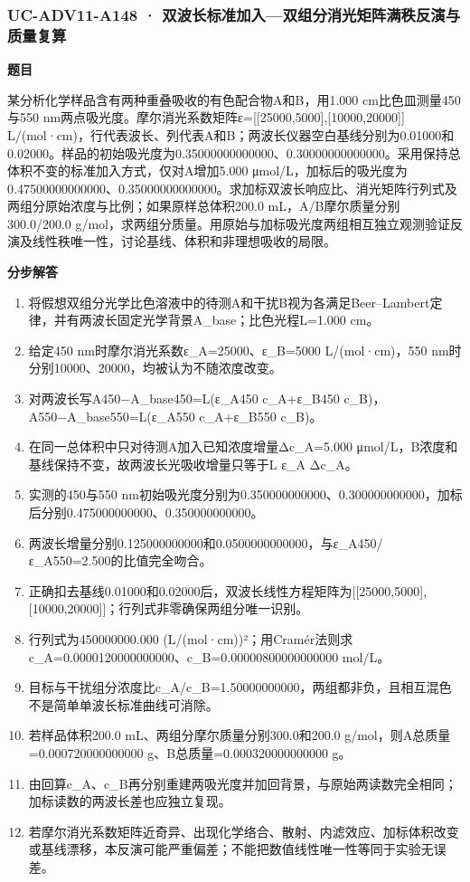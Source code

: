 \documentclass[UTF8,11pt,a4paper]{ctexart}
\begin{document}
\subsubsection*{UC-ADV11-A148 · 双波长标准加入—双组分消光矩阵满秩反演与质量复算}
\noindent\textbf{题目}\par
某分析化学样品含有两种重叠吸收的有色配合物A和B，用1.000 cm比色皿测量450与550 nm两点吸光度。摩尔消光系数矩阵ε=[[25000,5000],[10000,20000]] L/(mol·cm)，行代表波长、列代表A和B；两波长仪器空白基线分别为0.01000和0.02000。样品的初始吸光度为0.35000000000000、0.30000000000000。采用保持总体积不变的标准加入方式，仅对A增加5.000 μmol/L，加标后的吸光度为0.47500000000000、0.35000000000000。求加标双波长响应比、消光矩阵行列式及两组分原始浓度与比例；如果原样总体积200.0 mL，A/B摩尔质量分别300.0/200.0 g/mol，求两组分质量。用原始与加标吸光度两组相互独立观测验证反演及线性秩唯一性，讨论基线、体积和非理想吸收的局限。\par
\medskip\noindent\textbf{分步解答}
\begin{enumerate}
\item 将假想双组分光学比色溶液中的待测A和干扰B视为各满足Beer–Lambert定律，并有两波长固定光学背景A\_base；比色光程L=1.000 cm。
\item 给定450 nm时摩尔消光系数ε\_A=25000、ε\_B=5000 L/(mol·cm)，550 nm时分别10000、20000，均被认为不随浓度改变。
\item 对两波长写A450−A\_base450=L(ε\_A450 c\_A+ε\_B450 c\_B)，A550−A\_base550=L(ε\_A550 c\_A+ε\_B550 c\_B)。
\item 在同一总体积中只对待测A加入已知浓度增量Δc\_A=5.000 μmol/L，B浓度和基线保持不变，故两波长光吸收增量只等于L ε\_A Δc\_A。
\item 实测的450与550 nm初始吸光度分别为0.350000000000、0.300000000000，加标后分别0.475000000000、0.350000000000。
\item 两波长增量分别0.125000000000和0.0500000000000，与ε\_A450/ε\_A550=2.500的比值完全吻合。
\item 正确扣去基线0.01000和0.02000后，双波长线性方程矩阵为[[25000,5000],[10000,20000]]；行列式非零确保两组分唯一识别。
\item 行列式为450000000.000 (L/(mol·cm))²；用Cramér法则求c\_A=0.0000120000000000、c\_B=0.00000800000000000 mol/L。
\item 目标与干扰组分浓度比c\_A/c\_B=1.50000000000，两组都非负，且相互混色不是简单单波长标准曲线可消除。
\item 若样品体积200.0 mL、两组分摩尔质量分别300.0和200.0 g/mol，则A总质量=0.000720000000000 g、B总质量=0.000320000000000 g。
\item 由回算c\_A、c\_B再分别重建两吸光度并加回背景，与原始两读数完全相同；加标读数的两波长差也应独立复现。
\item 若摩尔消光系数矩阵近奇异、出现化学络合、散射、内滤效应、加标体积改变或基线漂移，本反演可能严重偏差；不能把数值线性唯一性等同于实验无误差。
\end{enumerate}
\end{document}
